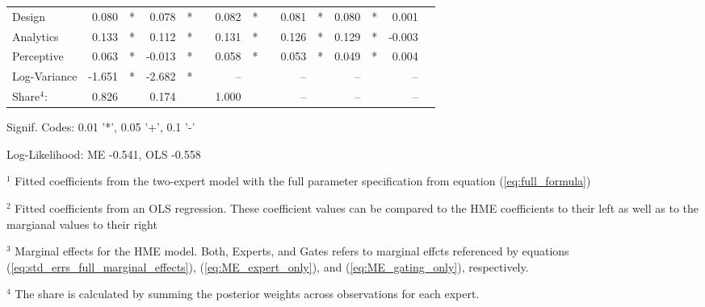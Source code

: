 \documentclass[12pt]{article}
\begin{document}
\begin{landscape}
\begin{table}
\begin{threeparttable}
\begin{tabular}[l]{l r l r l c r l c r l r l r l}
Design          &  0.080 & *      &  0.078 & *     &&  0.082 & *     &&  0.081 & *        &  0.080 & *        &  0.001 &        \\
Analytics       &  0.133 & *      &  0.112 & *     &&  0.131 & *     &&  0.126 & *        &  0.129 & *        & -0.003 &        \\
Perceptive      &  0.063 & *      & -0.013 & *     &&  0.058 & *     &&  0.053 & *        &  0.049 & *        &  0.004 &        \\
Log-Variance    & -1.651 & *      & -2.682 & *     &&  --    &       &&  --    &          &  --    &          &  --    &        \\
                \cmidrule(l){2-3} \cmidrule(l){4-5} \cmidrule(l){7-8} \cmidrule(l){10-11} \cmidrule(l){12-13} \cmidrule(l){14-15}
Share$^{4}$:          &  0.826 &        &  0.174 &       &&  1.000 &       &&  --    &          &  --    &          &  --    &        \\
\cmidrule{1-15}
      \end{tabular}

      \begin{tablenotes}
        \item Signif. Codes: 0.01 '*', 0.05 '+', 0.1 '-'
        \item Log-Likelihood: ME -0.541, OLS -0.558
        \item $^{1}$ Fitted coefficients from the two-expert model with the full parameter specification from equation (\ref{eq:full_formula})
        \item $^{2}$ Fitted coefficients from an OLS regression. These coefficient values can be compared to the HME coefficients to their left as well as to the margianal values to their right
        \item $^{3}$ Marginal effects for the HME model. Both, Experts, and Gates refers to marginal effcts referenced by equations (\ref{eq:std_errs_full_marginal_effects}), (\ref{eq:ME_expert_only}), and (\ref{eq:ME_gating_only}), respectively.
        \item $^{4}$ The share is calculated by summing the posterior weights across observations for each expert.

      \end{tablenotes} \label{tbl:2E_full_regressions_results}


    \end{threeparttable}

\end{table}
\end{landscape}
\end{document}
